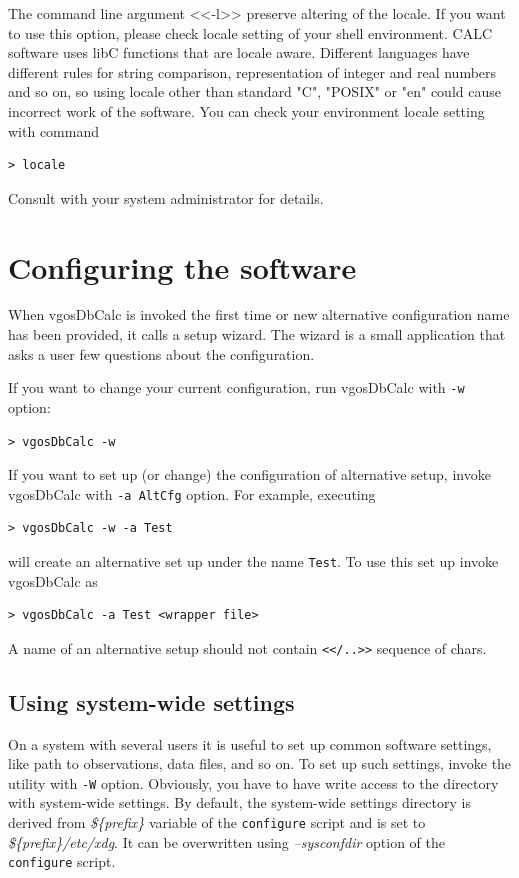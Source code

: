 \documentclass [10pt,letterpaper]{report}
\begin{document}
The command line argument <<-l>> preserve altering of the locale. If you want to
use this option,
please check locale setting of your shell environment.
CALC software uses libC functions that are locale aware.
Different languages have different rules for string comparison,
representation of integer and real numbers and so on, so using locale other
than standard "C", "POSIX" or "en" could cause incorrect work of the
software. You can check your environment locale setting with command
\begin{verbatim}
> locale
\end{verbatim}
\noindent
Consult with your system administrator for details.





%
%
\chapter{Configuring the software}
\label{chapter_configuration}
When vgosDbCalc is invoked the first time or new alternative
configuration name has been provided, it calls a setup wizard. The
wizard is a small application that asks a user few questions about the
configuration.

If you want to change your current configuration, run vgosDbCalc with
{\tt -w} option:
\begin{verbatim}
> vgosDbCalc -w
\end{verbatim}
\noindent
If you want to set up (or change) the configuration of alternative setup,
invoke vgosDbCalc with {\tt -a AltCfg} option. For example, executing
\begin{verbatim}
> vgosDbCalc -w -a Test
\end{verbatim}
will create an alternative set up under the name {\tt Test}. To use this
set up invoke vgosDbCalc as
\begin{verbatim}
> vgosDbCalc -a Test <wrapper file>
\end{verbatim}
A name of an alternative setup should not contain {\tt <</..>>} sequence of chars.



\section{Using system-wide settings}
\label{sect_systemwide_settings}
On a system with several users it is useful to set up common software settings,
like path to observations, data files, and so on. To set up such settings, invoke
the utility with {\tt -W} option. Obviously, you have to have write access to the
directory with system-wide settings. By default, the system-wide settings directory
is derived from {\sl \$\{prefix\}} variable of the {\tt configure} script and is
set to {\sl \$\{prefix\}/etc/xdg}. It can be overwritten using {\sl --sysconfdir}
option of the {\tt configure} script.
\end{document}
